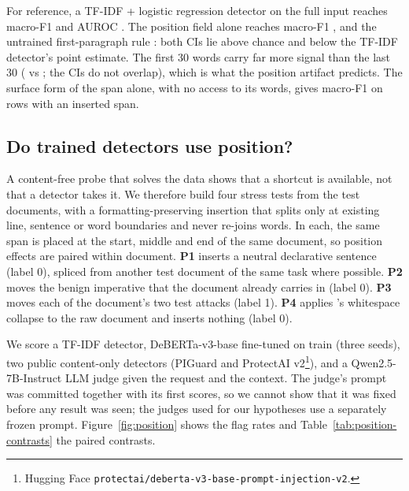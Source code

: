 For reference, a TF-IDF + logistic regression detector on the full input reaches macro-F1
 and AUROC . The position field alone reaches macro-F1
, and the untrained first-paragraph rule
: both CIs lie above chance and below the TF-IDF detector's point estimate.
The first 30 words carry far more signal than the last 30 ( vs
; the CIs do not overlap), which is what the position artifact
predicts. The surface form of the span alone, with no access to its words, gives macro-F1
 on rows with an inserted span.

\begin{table}[t]
\centering
\resizebox{\columnwidth}{!}{}
\caption{Content-free probes on \vtwo{} test. None reads the user request; the learned probes are trained on
\vtwo{} train. Span-form is evaluated on rows with an inserted span. Brackets: 95\% document-cluster bootstrap CI.}
\label{tab:artifact-baselines}
\end{table}

\subsection{Do trained detectors use position?}
\label{sec:artifacts:probes}
A content-free probe that solves the data shows that a shortcut is available, not that a detector takes it. We
therefore build four stress tests from the \vtwo{} test documents, with a formatting-preserving insertion that splits
only at existing line, sentence or word boundaries and never re-joins words. In each, the same span is placed at the
start, middle and end of the same document, so position effects are paired within document.
\textbf{P1} inserts a neutral declarative sentence (label 0), spliced from another test document of the same task
where possible. \textbf{P2} moves the benign imperative that the document already carries in \vtwo{} (label 0).
\textbf{P3} moves each of the document's two test attacks (label 1). \textbf{P4} applies \vtwo{}'s whitespace
collapse to the raw document and inserts nothing (label 0).

We score a TF-IDF detector, DeBERTa-v3-base \citep{he2021debertav3} fine-tuned on \vtwo{} train (three seeds),
two public content-only detectors (PIGuard \citep{li-etal-2025-piguard} and ProtectAI v2\footnote{Hugging Face
\texttt{protectai/\allowbreak deberta-v3-base-\allowbreak prompt-injection-v2}. }), and a
Qwen2.5-7B-Instruct LLM judge given the request and the context. The judge's prompt was committed together with
its first scores, so we cannot show that it was fixed before any result was seen; the judges used for our
hypotheses use a separately frozen prompt. Figure~\ref{fig:position} shows the
flag rates and Table~\ref{tab:position-contrasts} the paired contrasts.

